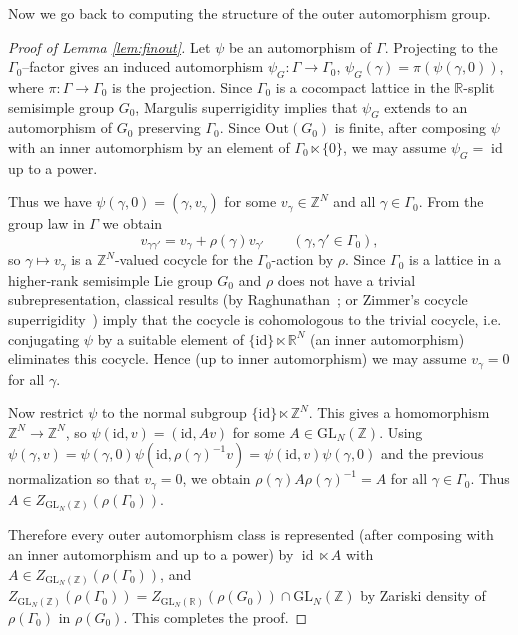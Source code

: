 \documentclass[11pt]{amsart}
\numberwithin{equation}{section}
\newcommand{\R}{\mathbb{R}}
\newcommand{\Z}{\mathbb{Z}}
\theoremstyle{plain}
\begin{document}
Now we go back to computing the structure of the outer automorphism group.
\begin{proof}[Proof of Lemma \ref{lem:finout}]
Let $\psi$ be an automorphism of $\Gamma$. Projecting to the
$\Gamma_0$--factor gives an induced automorphism
$\psi_G:\Gamma\to\Gamma_0$, $\psi_G(\gamma)=\pi(\psi(\gamma,0))$, where
$\pi:\Gamma\to\Gamma_0$ is the projection. Since $\Gamma_0$ is a
cocompact lattice in the $\R$-split semisimple group $G_0$, Margulis
superrigidity implies that $\psi_G$
extends to an automorphism of $G_0$ preserving $\Gamma_0$. Since
$\mathrm{Out}(G_0)$ is finite, after composing $\psi$ with an inner
automorphism by an element of $\Gamma_0\ltimes\{0\}$, we may assume
$\psi_G=\operatorname{id}$ up to a power.

Thus we have $\psi(\gamma,0)=(\gamma,v_\gamma)$ for some $v_\gamma\in\Z^N$ and
all $\gamma\in\Gamma_0$. From the group law in $\Gamma$ we obtain
\[
v_{\gamma\gamma'}=v_\gamma+\rho(\gamma)v_{\gamma'}\qquad(\gamma,\gamma'\in\Gamma_0),
\]
so $\gamma\mapsto v_\gamma$ is a $\Z^N$-valued cocycle for the
$\Gamma_0$-action by $\rho$. Since $\Gamma_0$ is a lattice in a higher‑rank semisimple Lie group $G_0$ and $\rho$ does not have a trivial subrepresentation, classical results (by Raghunathan~\cite{Raghunathan}; or Zimmer's cocycle superrigidity~\cite{Zimmer}) imply that the cocycle is cohomologous to the trivial cocycle, i.e. conjugating $\psi$ by a suitable element of
$\{\mathrm{id}\}\ltimes\R^N$ (an inner automorphism) eliminates this
cocycle. Hence (up to inner automorphism) we may assume $v_\gamma=0$
for all $\gamma$.

Now restrict $\psi$ to the normal subgroup $\{\mathrm{id}\}\ltimes\Z^N$.
This gives a homomorphism $\Z^N\to\Z^N$, so
$\psi(\mathrm{id},v)=(\mathrm{id},Av)$ for some
$A\in\mathrm{GL}_N(\Z)$. Using
$\psi(\gamma,v)=\psi(\gamma,0)\psi(\mathrm{id},\rho(\gamma)^{-1}v)=\psi(\mathrm{id},v)\psi(\gamma,0)$ and the previous
normalization so that $v_\gamma=0$, we obtain
$\rho(\gamma)A\rho(\gamma)^{-1}=A$ for all $\gamma\in\Gamma_0$. Thus
$A\in Z_{\mathrm{GL}_N(\Z)}(\rho(\Gamma_0))$.

Therefore every outer automorphism class is represented (after composing
with an inner automorphism and up to a power) by $\operatorname{id}\ltimes A$ with
$A\in Z_{\mathrm{GL}_N(\Z)}(\rho(\Gamma_0))$, and
$Z_{\mathrm{GL}_N(\Z)}(\rho(\Gamma_0))=Z_{\mathrm{GL}_N(\R)}(\rho(G_0))\cap\mathrm{GL}_N(\Z)$
by Zariski density of $\rho(\Gamma_0)$ in $\rho(G_0)$. This completes the proof.
\end{proof}
\end{document}
